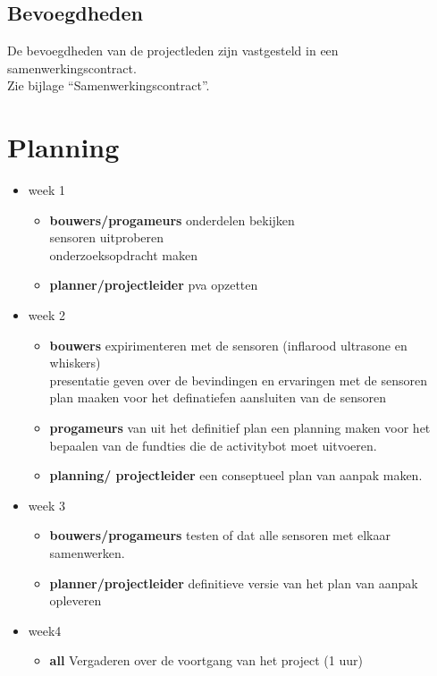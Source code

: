 \documentclass[oneside]{book}
\begin{document}
\section{Bevoegdheden}
De bevoegdheden van de projectleden zijn vastgesteld in een samenwerkingscontract.\\
Zie bijlage “Samenwerkingscontract”.
\clearpage
\chapter{Planning}
\begin{itemize}
\item week 1 
	\begin{itemize}		
	\item \textbf{bouwers/progameurs}
		onderdelen bekijken\\
		sensoren uitproberen\\
		onderzoeksopdracht maken\\
	\item \textbf{planner/projectleider}
		pva opzetten
	\end{itemize}
\item week 2
	\begin{itemize}	
	\item \textbf{bouwers}
		expirimenteren met de sensoren (inflarood ultrasone en whiskers)\\
		presentatie geven over de bevindingen en ervaringen met de sensoren\\
		plan maaken voor het definatiefen aansluiten van de sensoren
	\item \textbf{progameurs}
		van uit het definitief plan een planning maken voor het bepaalen van de fundties die de activitybot moet uitvoeren.
	\item \textbf{planning/ projectleider}
		een conseptueel plan van aanpak maken.
	\end{itemize}
\item week 3
	\begin{itemize}	
	\item \textbf{bouwers/progameurs} 
		testen of dat alle sensoren met elkaar samenwerken.
	\item \textbf{planner/projectleider}
		definitieve versie van het plan van aanpak opleveren
	\end{itemize}
\item week4
	\begin{itemize}	
	\item \textbf{all}
		Vergaderen over de voortgang van het project (1 uur)\\

\end{itemize}
\end{itemize}
\end{document}
